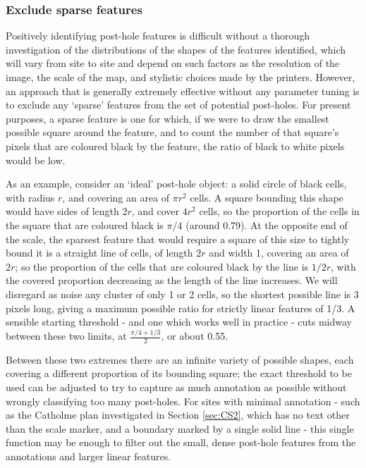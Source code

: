 \documentclass[../../ArchStats.tex]{subfiles}
\begin{document}
\subsubsection{Exclude sparse features}
\label{sec:excl-sparse}

Positively identifying post-hole features is difficult without a thorough investigation of the distributions of the shapes of the features identified, which will vary from site to site and depend on such factors as the resolution of the image, the scale of the map, and stylistic choices made by the printers. However, an approach that is generally extremely effective without any parameter tuning is to exclude any `sparse' features from the set of potential post-holes. For present purposes, a sparse feature is one for which, if we were to draw the smallest possible square around the feature, and to count the number of that square's pixels that are coloured black by the feature, the ratio of black to white pixels would be low.


As an example, consider an `ideal' post-hole object: a solid circle of black cells, with radius $r$, and covering an area of $\pi r^2$ cells. A square bounding this shape would have sides of length $2r$, and cover $4r^2$ cells, so the proportion of the cells in the square that are coloured black is $\pi/4$ (around 0.79). At the opposite end of the scale, the sparsest feature that would require a square of this size to tightly bound it is a straight line of cells, of length $2r$ and width 1, covering an area of $2r$; so the proportion of the cells that are coloured black by the line is $1/2r$, with the covered proportion decreasing as the length of the line increases. We will disregard as noise any cluster of only 1 or 2 cells, so the shortest possible line is 3 pixels long, giving a maximum possible ratio for strictly linear features of 1/3. A sensible starting threshold - and one which works well in practice - cuts midway between these two limits, at $\frac{\pi/4+1/3}{2}$, or about 0.55. 

Between these two extremes there are an infinite variety of possible shapes, each covering a different proportion of its bounding square; the exact threshold to be used can be adjusted to try to capture as much annotation as possible without wrongly classifying too many post-holes. For sites with minimal annotation - such as the Catholme plan investigated in Section \ref{sec:CS2}, which has no text other than the scale marker, and a boundary marked by a single solid line - this single function may be enough to filter out the small, dense post-hole features from the annotations and larger linear features.
\end{document}
